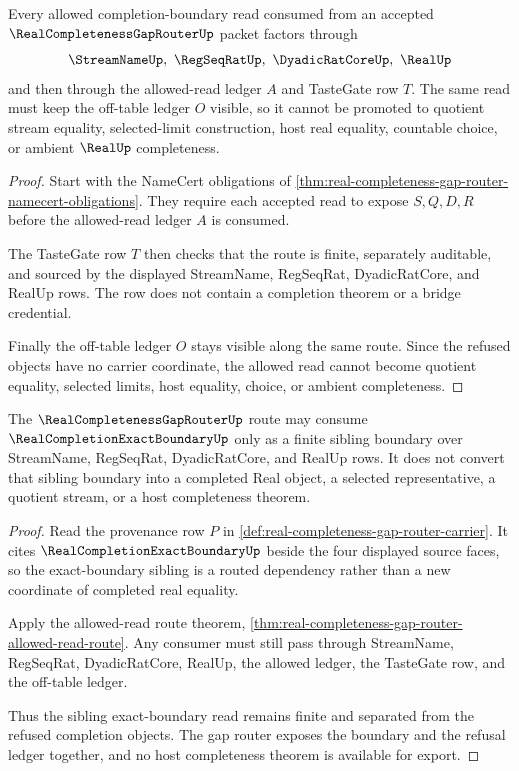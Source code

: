 \begin{theorem}
\label{thm:real-completeness-gap-router-allowed-read-route}
Every allowed completion-boundary read consumed from an accepted $\RealCompletenessGapRouterUp$ packet factors through
$$
\StreamNameUp,\ \RegSeqRatUp,\ \DyadicRatCoreUp,\ \RealUp
$$
and then through the allowed-read ledger $A$ and TasteGate row $T$. The same read must keep the off-table ledger $O$ visible, so it cannot be promoted to quotient stream equality, selected-limit construction, host real equality, countable choice, or ambient $\RealUp$ completeness.
\end{theorem}
\begin{proof}
Start with the NameCert obligations of \autoref{thm:real-completeness-gap-router-namecert-obligations}. They require each accepted read to expose $S,Q,D,R$ before the allowed-read ledger $A$ is consumed.

The TasteGate row $T$ then checks that the route is finite, separately auditable, and sourced by the displayed StreamName, RegSeqRat, DyadicRatCore, and RealUp rows. The row does not contain a completion theorem or a bridge credential.

Finally the off-table ledger $O$ stays visible along the same route. Since the refused objects have no carrier coordinate, the allowed read cannot become quotient equality, selected limits, host equality, choice, or ambient completeness.
\end{proof}

\begin{theorem}
\label{thm:real-completeness-gap-router-exact-boundary-separation}
The $\RealCompletenessGapRouterUp$ route may consume $\RealCompletionExactBoundaryUp$ only as a finite sibling boundary over StreamName, RegSeqRat, DyadicRatCore, and RealUp rows. It does not convert that sibling boundary into a completed Real object, a selected representative, a quotient stream, or a host completeness theorem.
\end{theorem}
\begin{proof}
Read the provenance row $P$ in \autoref{def:real-completeness-gap-router-carrier}. It cites $\RealCompletionExactBoundaryUp$ beside the four displayed source faces, so the exact-boundary sibling is a routed dependency rather than a new coordinate of completed real equality.

Apply the allowed-read route theorem, \autoref{thm:real-completeness-gap-router-allowed-read-route}. Any consumer must still pass through StreamName, RegSeqRat, DyadicRatCore, RealUp, the allowed ledger, the TasteGate row, and the off-table ledger.

Thus the sibling exact-boundary read remains finite and separated from the refused completion objects. The gap router exposes the boundary and the refusal ledger together, and no host completeness theorem is available for export.
\end{proof}

